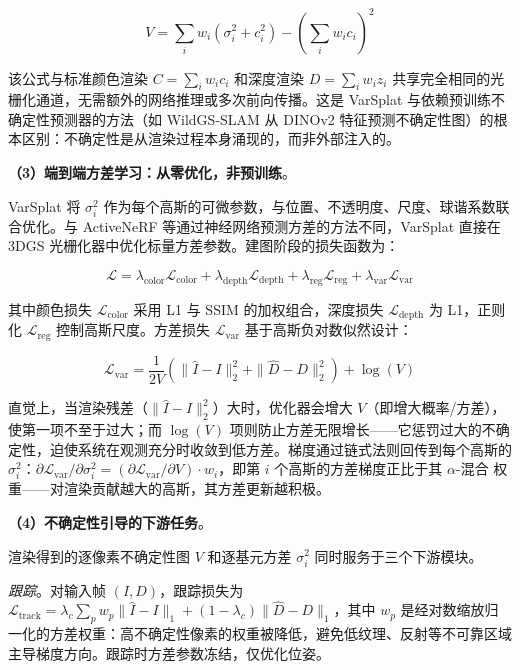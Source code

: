 \begin{equation}
    V = \sum_{i} w_i(\sigma_i^2 + c_i^2) - \left(\sum_{i} w_i c_i\right)^2
\end{equation}

该公式与标准颜色渲染 $C = \sum_i w_i c_i$ 和深度渲染 $D = \sum_i w_i z_i$ 共享完全相同的光栅化通道，无需额外的网络推理或多次前向传播。这是 VarSplat 与依赖预训练不确定性预测器的方法（如 WildGS-SLAM 从 DINOv2 特征预测不确定性图）的根本区别：不确定性是从渲染过程本身涌现的，而非外部注入的。

\textbf{（3）端到端方差学习：从零优化，非预训练}。

VarSplat 将 $\sigma_i^2$ 作为每个高斯的可微参数，与位置、不透明度、尺度、球谐系数联合优化。与 ActiveNeRF 等通过神经网络预测方差的方法不同，VarSplat 直接在 3DGS 光栅化器中优化标量方差参数。建图阶段的损失函数为：

\begin{equation}
    \mathcal{L} = \lambda_\text{color} \mathcal{L}_\text{color} + \lambda_\text{depth} \mathcal{L}_\text{depth} + \lambda_\text{reg} \mathcal{L}_\text{reg} + \lambda_\text{var} \mathcal{L}_\text{var}
\end{equation}

其中颜色损失 $\mathcal{L}_\text{color}$ 采用 L1 与 SSIM 的加权组合，深度损失 $\mathcal{L}_\text{depth}$ 为 L1，正则化 $\mathcal{L}_\text{reg}$ 控制高斯尺度。方差损失 $\mathcal{L}_\text{var}$ 基于高斯负对数似然设计：

\begin{equation}
    \mathcal{L}_\text{var} = \frac{1}{2V}\left(\|\hat{I} - I\|_2^2 + \|\hat{D} - D\|_2^2\right) + \log(V)
\end{equation}

直觉上，当渲染残差（$\|\hat{I} - I\|_2^2$）大时，优化器会增大 $V$（即增大概率/方差），使第一项不至于过大；而 $\log(V)$ 项则防止方差无限增长——它惩罚过大的不确定性，迫使系统在观测充分时收敛到低方差。梯度通过链式法则回传到每个高斯的 $\sigma_i^2$：$\partial \mathcal{L}_\text{var}/\partial \sigma_i^2 = (\partial \mathcal{L}_\text{var}/\partial V) \cdot w_i$，即第 $i$ 个高斯的方差梯度正比于其 $\alpha$-混合 权重——对渲染贡献越大的高斯，其方差更新越积极。

\textbf{（4）不确定性引导的下游任务}。

渲染得到的逐像素不确定性图 $V$ 和逐基元方差 $\sigma_i^2$ 同时服务于三个下游模块。

\textit{跟踪}。对输入帧 $(I, D)$，跟踪损失为 $\mathcal{L}_\text{track} = \lambda_c \sum_p w_p \|\hat{I} - I\|_1 + (1-\lambda_c)\|\hat{D} - D\|_1$，其中 $w_p$ 是经对数缩放归一化的方差权重：高不确定性像素的权重被降低，避免低纹理、反射等不可靠区域主导梯度方向。跟踪时方差参数冻结，仅优化位姿。

